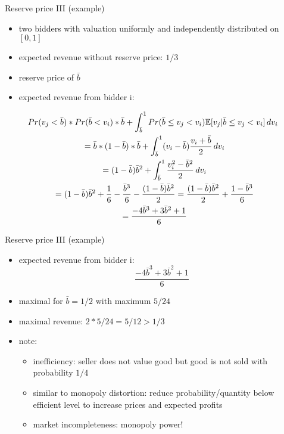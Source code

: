 \documentclass[bigger]{beamer}
\begin{document}
\begin{frame}[label={sec:org9dbd0e9}]{Reserve price III (example)}
\begin{itemize}
\item two bidders with valuation uniformly and independently distributed on \([0,1]\)
\item expected revenue without reserve price: \(1/3\)
\item reserve price of \(\bar b\)
\item expected revenue from bidder i:
\end{itemize}
\begin{multline*}
\hspace*{-0.15cm}Pr(v_j<\bar b)*Pr(\bar b<v_i)*\bar b+\int_{\bar b}^1 Pr(\bar b\leq v_j<v_i)\mathbb{E}[v_j|\bar b\leq v_j<v_i]\,dv_i\\
=\bar b*(1-\bar b)*\bar b+\int_{\bar b}^1 (v_i-\bar b)\frac{v_i+\bar b}{2}\, dv_i\\
= (1-\bar b)\bar b^2+\int_{\bar b}^1\frac{v_i^2-\bar b^2}{2}\,dv_i\\
= (1-\bar b)\bar b^2+ \frac{1}{6}-\frac{\bar b^3}{6}-\frac{(1-\bar b)\bar b^2}{2}=\frac{(1-\bar b)\bar b^2}{2}+\frac{1-\bar b^3}{6}\\
=\frac{-4\bar b^3+3\bar b^2+1}{6}
\end{multline*}
\end{frame}
\begin{frame}[label={sec:orge37fe04}]{Reserve price III (example)}
\begin{itemize}
\item expected revenue from bidder i:
$$\frac{-4\bar b^3+3\bar b^2+1}{6}$$
\item maximal for \(\bar b=1/2\) with maximum \(5/24\)
\item maximal revenue: \(2*5/24=5/12>1/3\)
\item note:
\begin{itemize}
\item inefficiency: seller does not value good but good is not sold with probability \(1/4\)
\item similar to monopoly distortion: reduce probability/quantity below efficient level to increase prices and expected profits
\item market incompleteness: monopoly power!
\end{itemize}
\end{itemize}
\end{frame}
\end{document}
